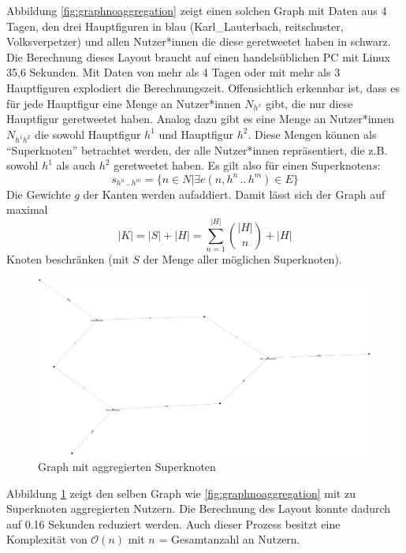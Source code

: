 Abbildung \ref{fig:graphnoaggregation} zeigt einen solchen Graph mit Daten aus 4 Tagen, den drei Hauptfiguren in blau (Karl\_Lauterbach, reitschuster, Volksverpetzer) und allen Nutzer*innen die diese \gls{geretweetet} haben in schwarz. Die Berechnung dieses Layout braucht auf einen handelsüblichen PC mit Linux 35,6 Sekunden. 
Mit Daten von mehr als 4 Tagen oder mit mehr als 3 Hauptfiguren explodiert die Berechnungszeit. 
Offensichtlich erkennbar ist, dass es  für jede Hauptfigur eine Menge an Nutzer*innen $N_{h^x}$ gibt, die nur diese Hauptfigur \gls{geretweetet} haben.
Analog dazu gibt es eine Menge an Nutzer*innen $N_{h^1h^2}$ die sowohl Hauptfigur $h^1$ und Hauptfigur $h^2$. 
Diese Mengen können als "`Superknoten"' betrachtet werden, der alle Nutzer*innen repräsentiert, die z.B. sowohl $h^1$ als auch $h^2$ \gls{geretweetet} haben.
Es gilt also für einen Superknoten$s$:
 \begin{equation}
s_{h^n\,..\,h^m} = \{n\in N|\exists e(n,h^n\,..\,h^m)\in E\}
\end{equation}
Die Gewichte $g$ der Kanten werden aufaddiert. 
Damit lässt sich der Graph auf maximal
\begin{equation}
|K| = |S| + |H| = \sum_{n=1}^{|H|} \binom{|H|}{n} + |H|
\end{equation}
Knoten beschränken (mit $S$ der Menge aller möglichen Superknoten).
\begin{figure}[h]
	\centering
	\includegraphics[width=0.7\linewidth]{images/GraphNoThreshold}
	\caption{Graph mit aggregierten Superknoten}
	\label{fig:graphnothreshold}
\end{figure}
Abbildung \ref{fig:graphnothreshold} zeigt den selben Graph wie \ref{fig:graphnoaggregation} mit zu Superknoten aggregierten Nutzern.
Die Berechnung des Layout konnte dadurch auf 0.16 Sekunden reduziert werden.
Auch dieser Prozess besitzt eine Komplexität von $\mathcal{O}(n)$ mit $n$ = Gesamtanzahl an Nutzern. 
